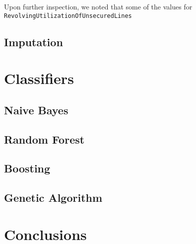 \documentclass[11pt, oneside]{article}   	%
\begin{document}
	Upon further inspection, we noted that some of the values for \tt RevolvingUtilizationOfUnsecuredLines
	\subsection{Imputation}
\section{Classifiers}
	\subsection{Naive Bayes}
	\subsection{Random Forest}
	\subsection{Boosting}
	\subsection{Genetic Algorithm}
\section{Conclusions}
\end{document}
